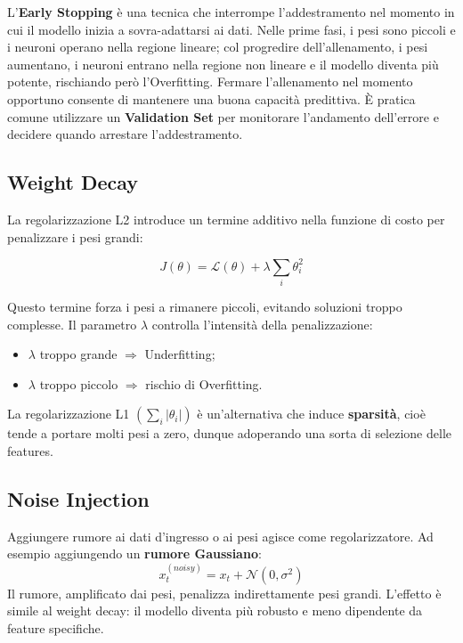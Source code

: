 L’\textbf{Early Stopping} è una tecnica che interrompe l’addestramento nel momento in cui il modello inizia a sovra-adattarsi ai dati. Nelle prime fasi, i pesi sono piccoli e i neuroni operano nella regione lineare; col progredire dell’allenamento, i pesi aumentano, i neuroni entrano nella regione non lineare e il modello diventa più potente, rischiando però l’Overfitting. Fermare l’allenamento nel momento opportuno consente di mantenere una buona capacità predittiva. È pratica comune utilizzare un \textbf{Validation Set} per monitorare l’andamento dell’errore e decidere quando arrestare l’addestramento.

\subsection{Weight Decay}

La regolarizzazione L2 introduce un termine additivo nella funzione di costo per penalizzare i pesi grandi:

\begin{equation}
J(\theta) = \mathcal{L}(\theta) + \lambda \sum_i \theta_i^2
\end{equation}

Questo termine forza i pesi a rimanere piccoli, evitando soluzioni troppo complesse. Il parametro $\lambda$ controlla l’intensità della penalizzazione:

\begin{itemize}
\item $\lambda$ troppo grande $\Rightarrow$ Underfitting;
\item $\lambda$ troppo piccolo $\Rightarrow$ rischio di Overfitting.
\end{itemize}

La regolarizzazione L1 $ (\sum_i |\theta_i|)$ è un’alternativa che induce \textbf{sparsità}, cioè tende a portare molti pesi a zero, dunque adoperando una sorta di selezione delle features.

\subsection{Noise Injection}

Aggiungere rumore ai dati d’ingresso o ai pesi agisce come regolarizzatore. Ad esempio aggiungendo un \textbf{rumore Gaussiano}:
\[
x_t^{(noisy)} = x_t + \mathcal{N}(0, \sigma^2)
\]
Il rumore, amplificato dai pesi, penalizza indirettamente pesi grandi. L’effetto è simile al weight decay: il modello diventa più robusto e meno dipendente da feature specifiche.

